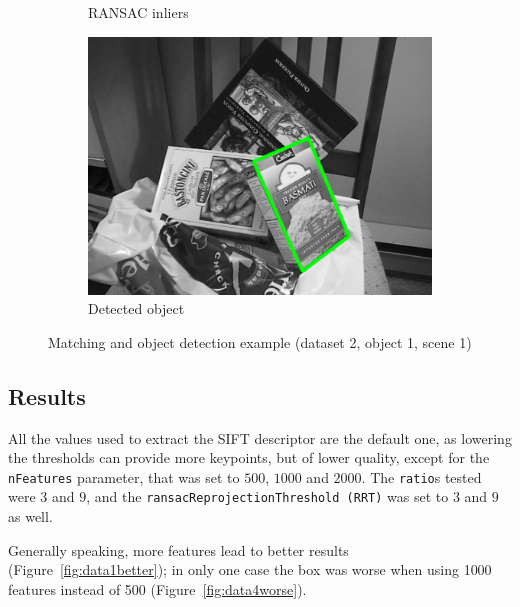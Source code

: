 \documentclass[a4paper]{article}
\newcommand{\rfig}[1]{Figure~\ref{#1}}
\begin{document}
\begin{figure}[h!]
\begin{subfigure}[b]{0.45\textwidth}
        \caption{RANSAC inliers}
        \label{fig:ransacmatches}
    \end{subfigure}
    \quad
    \begin{subfigure}[b]{0.45\textwidth}
        \includegraphics[width=\textwidth]{Data2_FoundMatches_0_0_ratio3_RRT3_NF1000.png}
        \caption{Detected object}
        \label{fig:foundobject}
    \end{subfigure}
    \caption{Matching and object detection example (dataset 2, object 1, scene 1)}
    \label{fig:matches}
\end{figure}

\subsection{Results}
\label{sss:results}
All the values used to extract the SIFT descriptor are the default one, as lowering the thresholds can provide more keypoints, but of lower quality, except for the \texttt{nFeatures} parameter, that was set to $500$, $1000$ and $2000$. The \texttt{ratio}s tested were $3$ and $9$, and the \texttt{ransacReprojectionThreshold (RRT)} was set to $3$ and $9$ as well.

Generally speaking, more features lead to better results (\rfig{fig:data1better}); in only one case the box was worse when using 1000 features instead of 500 (\rfig{fig:data4worse}).
\end{document}
